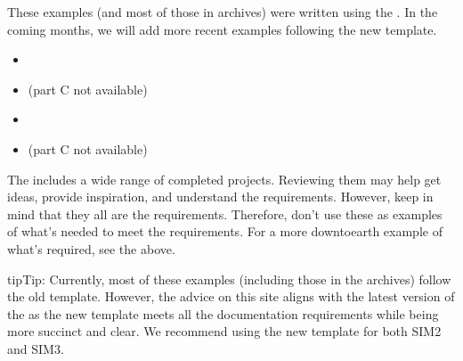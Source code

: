 \documentclass[letterpaper,10pt,english]{jupyterBook}
\begin{document}
\sphinxAtStartPar
These examples (and most of those in archives) were written using the . In the coming months, we will add more recent examples following the new template.

\sphinxAtStartPar
{}
\begin{itemize}
\item {} 
\sphinxAtStartPar
{}

\item {} 
\sphinxAtStartPar
{} (part C not available)

\end{itemize}

\sphinxAtStartPar
{}
\begin{itemize}
\item {} 
\sphinxAtStartPar
{}

\item {} 
\sphinxAtStartPar
{} (part C not available)

\end{itemize}
\label{\detokenize{resources:resources-examples-archive}}
\sphinxAtStartPar
{}

\sphinxAtStartPar
The  includes a wide range of completed projects. Reviewing them may help get ideas, provide inspiration, and understand the requirements. However, keep in mind that they all are  the requirements. Therefore, don’t use these as examples of what’s needed to meet the requirements. For a more down\sphinxhyphen{}to\sphinxhyphen{}earth example of what’s required, see the {\hyperref[\detokenize{resources:resources-examples}]{}} above.

\begin{sphinxadmonition}{tip}{Tip:}
\sphinxAtStartPar
Currently, most of these examples (including those in the archives) follow the old template. However, the advice on this site aligns with the latest version of the  as the new template meets all the documentation requirements while being more succinct and clear. We recommend using the new template for both SIM2 and SIM3.
\end{sphinxadmonition}
\end{document}
